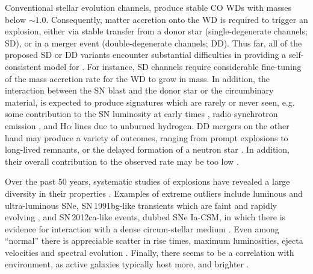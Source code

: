 \documentclass[../../main/thesis_msc.tex]{subfiles}
\begin{document}
Conventional stellar evolution channels, produce stable CO WDs with masses below $\sim 1.0$\msun. 
Consequently, matter accretion onto the WD is required to trigger an 
explosion, either via stable  transfer from a 
donor star (single-degenerate channels; SD), or in a 
merger event (double-degenerate channels; DD).  
Thus far, all of the proposed SD or DD variants    
encounter substantial difficulties in providing 
a self-consistent model for \ias \citep{Livio:2018rue}. 
For instance, SD channels require considerable fine-tuning
of the mass accretion rate for
the WD to grow in mass. In addition, the interaction between  
the SN blast and the donor star or the circumbinary material, is expected to produce  signatures which 
are rarely or never seen, e.g. some contribution to the SN  luminosity 
at early times \citep{Kasen:2009si}, radio synchrotron emission 
\citep{Harris:2016hfr}, and H$\alpha$ lines due to unburned hydrogen. 
DD mergers on the other hand may produce a variety of outcomes, 
ranging from prompt 
explosions to long-lived remnants, or the delayed formation of a neutron star \citep{Livio:2018rue}. In addition, their overall contribution to the observed \ia rate may be too low \citep{vanKerkwijk:2010he,claeys2014a,Sato:2015spa}. %


Over the past 50 years, systematic studies of \ia explosions have revealed a large
diversity in their properties \citep{Taubenberger:2017hoo}. 
Examples of extreme outliers include luminous 
\citep[e.g. SN\,1991T;][]{filippenko1992} and ultra-luminous  
\citep[e.g. SNLS-03D3bb;][]{Howell:2006vn} SNe, SN\,1991bg-like transients which
are faint and rapidly evolving \citep{ruiz-lapuente1993},  
and SN\,2012ca-like events, dubbed SNe Ia-CSM, in which 
there is evidence for interaction with a dense circum-stellar 
medium \citep{Bochenek:2017vok}. 
Even among ``normal'' \ias there is appreciable
scatter in rise times, maximum luminosities, ejecta velocities and spectral evolution   
\citep[][]{Livio:2018rue}. 
Finally, there seems to be a correlation with environment, 
as active  galaxies typically  host more,  and brighter \ias \citep{Maoz:2013hna}. 
\end{document}
